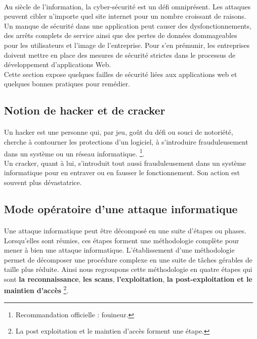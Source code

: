 \paragraph{}
  Au siècle de l'information, la cyber-sécurité est un défi omniprésent. Les attaques peuvent cibler n'importe quel site internet pour un nombre croissant de raisons. Un manque de sécurité dans une application peut causer des dysfonctionnements, des arrêts complets de service ainsi que des pertes de données dommageables pour les utilisateurs et l'image de l'entreprise. Pour s'en prémunir, les entreprises doivent mettre en place des mesures de sécurité strictes dans le processus de développement d'applications Web. \\
  Cette section expose quelques failles de s\'ecurit\'e li\'ees aux applications web et quelques bonnes pratiques pour rem\'edier.
  
\subsection{Notion de hacker et de cracker}
  \paragraph{}
    Un hacker est une personne qui, par jeu, goût du défi ou souci de notoriété, cherche à contourner les protections d'un logiciel, à s'introduire frauduleusement dans un système ou un réseau informatique. \cite{A} \footnote{Recommandation officielle : fouineur.}.\\Un cracker, quant à lui, s’introduit tout aussi frauduleusement dans un système informatique pour en entraver ou en fausser le fonctionnement. Son action est souvent plus dévastatrice.
	

\subsection{Mode opératoire d'une attaque informatique}
  \paragraph{}
    Une attaque informatique peut être décomposé en une suite d’étapes ou phases. Lorsqu’elles sont réunies, ces étapes forment une méthodologie complète pour mener à bien une attaque informatique. L’établissement d’une méthodologie permet de décomposer une procédure complexe en une suite de tâches gérables de taille plus réduite. Ainsi nous regroupons cette méthodologie en quatre étapes qui sont \textbf{la reconnaissance}, \textbf{les scans}, \textbf{l'exploitation}, \textbf{la post-exploitation et le maintien d'accès} \footnote{La post exploitation et le maintien d'accès forment une étape.}\cite{c}.
      
